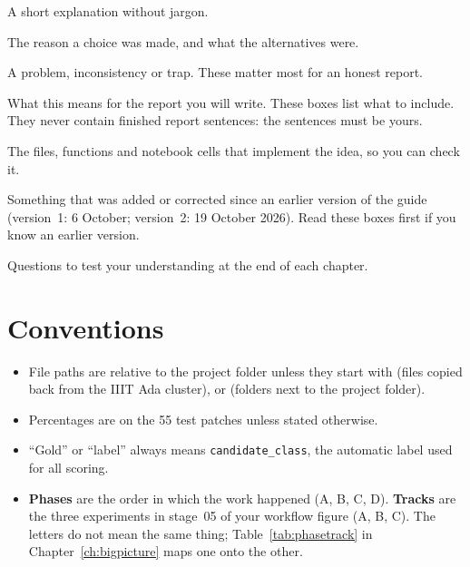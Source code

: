 \begin{plainwords}
A short explanation without jargon.
\end{plainwords}
\begin{whybox}
The reason a choice was made, and what the alternatives were.
\end{whybox}
\begin{watchout}
A problem, inconsistency or trap. These matter most for an honest report.
\end{watchout}
\begin{foryourreport}
What this means for the report you will write. These boxes list what to include. They never contain finished report sentences: the sentences must be yours.
\end{foryourreport}
\begin{wherecode}
The files, functions and notebook cells that implement the idea, so you can check it.
\end{wherecode}
\begin{newinfo}
Something that was added or corrected since an earlier version of the guide (version~1: 6 October; version~2: 19 October 2026). Read these boxes first if you know an earlier version.
\end{newinfo}
\begin{selfcheck}
Questions to test your understanding at the end of each chapter.
\end{selfcheck}

\section{Conventions}

\begin{itemize}
  \item File paths are relative to the project folder  unless they start with  (files copied back from the IIIT Ada cluster),  or  (folders next to the project folder).
  \item Percentages are on the 55 test patches unless stated otherwise.
  \item ``Gold'' or ``label'' always means \texttt{candidate\_class}, the automatic label used for all scoring.
  \item \textbf{Phases} are the order in which the work happened (A, B, C, D). \textbf{Tracks} are the three experiments in stage~05 of your workflow figure (A, B, C). The letters do not mean the same thing; Table~\ref{tab:phasetrack} in Chapter~\ref{ch:bigpicture} maps one onto the other.
\end{itemize}

